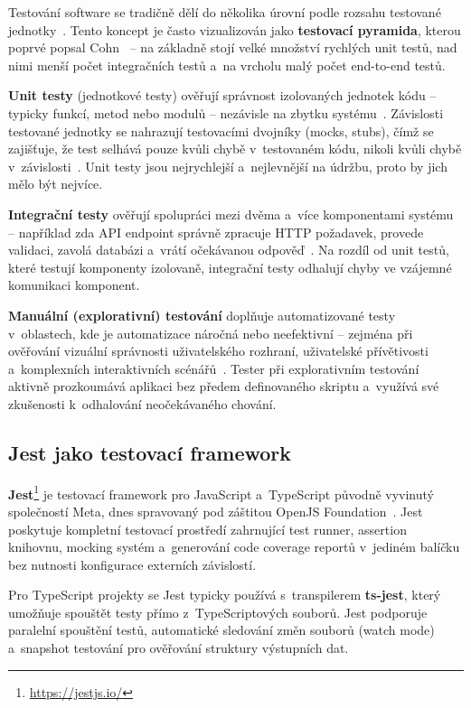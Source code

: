Testování software se tradičně dělí do několika úrovní podle rozsahu testované jednotky~\cite{sommerville2016se}. Tento koncept je často vizualizován jako \textbf{testovací pyramida}, kterou poprvé popsal Cohn~\cite{cohn2010agile} -- na základně stojí velké množství rychlých unit testů, nad nimi menší počet integračních testů a~na vrcholu malý počet end-to-end testů.

\textbf{Unit testy} (jednotkové testy) ověřují správnost izolovaných jednotek kódu -- typicky funkcí, metod nebo modulů -- nezávisle na zbytku systému~\cite{beck2003tdd}. Závislosti testované jednotky se nahrazují testovacími dvojníky (mocks, stubs), čímž se zajišťuje, že test selhává pouze kvůli chybě v~testovaném kódu, nikoli kvůli chybě v~závislosti~\cite{meszaros2007xunit}. Unit testy jsou nejrychlejší a~nejlevnější na údržbu, proto by jich mělo být nejvíce.

\textbf{Integrační testy} ověřují spolupráci mezi dvěma a~více komponentami systému -- například zda API endpoint správně zpracuje HTTP požadavek, provede validaci, zavolá databázi a~vrátí očekávanou odpověď~\cite{sommerville2016se}. Na rozdíl od unit testů, které testují komponenty izolovaně, integrační testy odhalují chyby ve vzájemné komunikaci komponent.

\textbf{Manuální (explorativní) testování} doplňuje automatizované testy v~oblastech, kde je automatizace náročná nebo neefektivní -- zejména při ověřování vizuální správnosti uživatelského rozhraní, uživatelské přívětivosti a~komplexních interaktivních scénářů~\cite{whittaker2009exploratory}. Tester při explorativním testování aktivně prozkoumává aplikaci bez předem definovaného skriptu a~využívá své zkušenosti k~odhalování neočekávaného chování.

\subsection{Jest jako testovací framework}

\textbf{Jest}\footnote{\url{https://jestjs.io/}} je testovací framework pro JavaScript a~TypeScript původně vyvinutý společností Meta, dnes spravovaný pod záštitou OpenJS Foundation~\cite{jest2024docs}. Jest poskytuje kompletní testovací prostředí zahrnující test runner, assertion knihovnu, mocking systém a~generování code coverage reportů v~jediném balíčku bez nutnosti konfigurace externích závislostí.

Pro TypeScript projekty se Jest typicky používá s~transpilerem \textbf{ts-jest}, který umožňuje spouštět testy přímo z~TypeScriptových souborů. Jest podporuje paralelní spouštění testů, automatické sledování změn souborů (watch mode) a~snapshot testování pro ověřování struktury výstupních dat.
